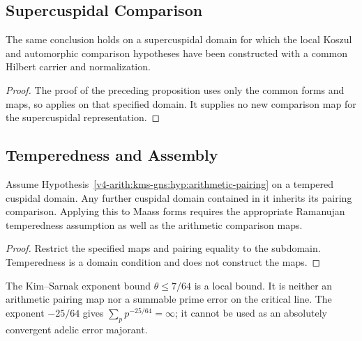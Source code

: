 \subsection{Supercuspidal Comparison}
\label{v4-arith:kms-gns:cycle2:supercuspidal}
\begin{lemma}
\label{v4-arith:kms-gns:lem:supercuspidal}
The same conclusion holds on a supercuspidal domain for which the
local Koszul and automorphic comparison hypotheses have been
constructed with a common Hilbert carrier and normalization.
\end{lemma}
\begin{proof}
The proof of the preceding proposition uses only the common forms
and maps, so applies on that specified domain. It supplies no new
comparison map for the supercuspidal representation.
\end{proof}

\subsection{Temperedness and Assembly}
\label{v4-arith:kms-gns:cycle2:ramanujan}
\begin{proposition}
\label{v4-arith:kms-gns:prop:non-tempered-residue}
Assume Hypothesis~\ref{v4-arith:kms-gns:hyp:arithmetic-pairing} on a
tempered cuspidal domain. Any further cuspidal domain contained in
it inherits its pairing comparison. Applying this to Maass forms
requires the appropriate Ramanujan temperedness assumption as well
as the arithmetic comparison maps.
\end{proposition}
\begin{proof}
Restrict the specified maps and pairing equality to the subdomain.
Temperedness is a domain condition and does not construct the maps.
\end{proof}

\begin{remark}
\label{v4-arith:kms-gns:rem:partial-KS}
The Kim--Sarnak exponent bound \(\theta\leq7/64\) is a local
bound. It is neither an arithmetic pairing map nor a summable
prime error on the critical line. The exponent \(-25/64\) gives
\(\sum_p p^{-25/64}=\infty\); it cannot be used as an absolutely
convergent adelic error majorant.
\end{remark}

